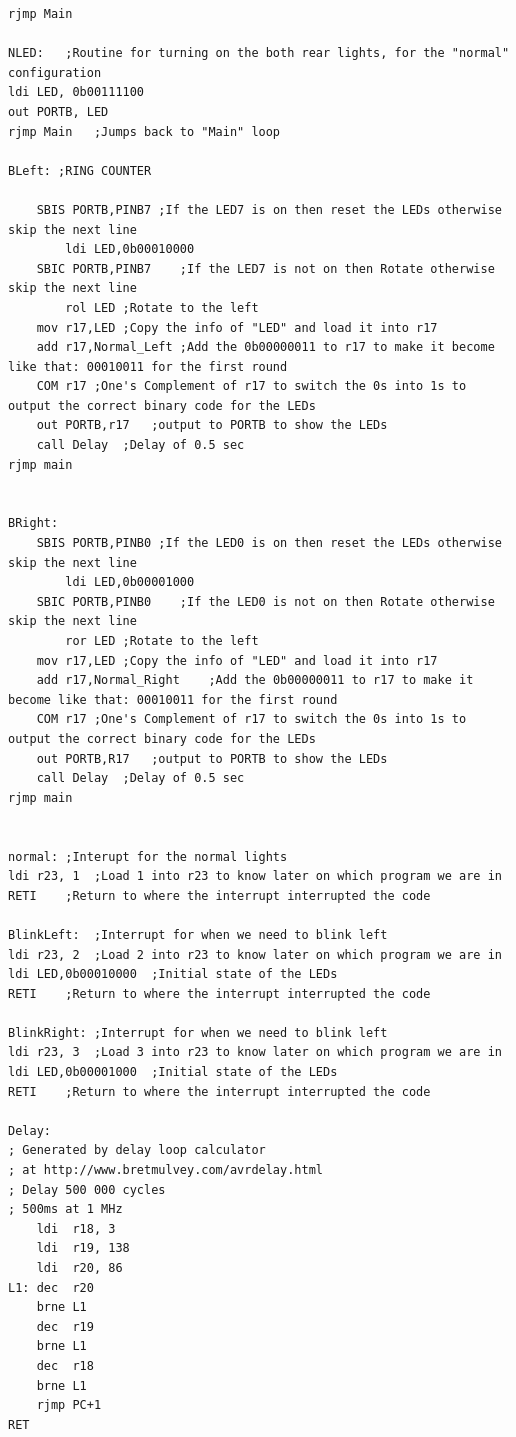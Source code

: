 \documentclass[a4paper,12pt]{article}
\begin{document}
\begin{lstlisting}
rjmp Main

NLED:	;Routine for turning on the both rear lights, for the "normal" configuration
ldi LED, 0b00111100
out PORTB, LED
rjmp Main	;Jumps back to "Main" loop 

BLeft: ;RING COUNTER

	SBIS PORTB,PINB7 ;If the LED7 is on then reset the LEDs otherwise skip the next line
		ldi LED,0b00010000
	SBIC PORTB,PINB7	;If the LED7 is not on then Rotate otherwise skip the next line 
		rol LED	;Rotate to the left 
	mov r17,LED	;Copy the info of "LED" and load it into r17
	add r17,Normal_Left	;Add the 0b00000011 to r17 to make it become like that: 00010011 for the first round 
	COM r17	;One's Complement of r17 to switch the 0s into 1s to output the correct binary code for the LEDs
	out PORTB,r17	;output to PORTB to show the LEDs
	call Delay	;Delay of 0.5 sec
rjmp main


BRight:
	SBIS PORTB,PINB0 ;If the LED0 is on then reset the LEDs otherwise skip the next line
		ldi LED,0b00001000
	SBIC PORTB,PINB0	;If the LED0 is not on then Rotate otherwise skip the next line 
		ror LED	;Rotate to the left 
	mov r17,LED	;Copy the info of "LED" and load it into r17
	add r17,Normal_Right	;Add the 0b00000011 to r17 to make it become like that: 00010011 for the first round 
	COM r17	;One's Complement of r17 to switch the 0s into 1s to output the correct binary code for the LEDs
	out PORTB,R17	;output to PORTB to show the LEDs
	call Delay	;Delay of 0.5 sec
rjmp main


normal:	;Interupt for the normal lights
ldi r23, 1	;Load 1 into r23 to know later on which program we are in
RETI	;Return to where the interrupt interrupted the code 

BlinkLeft:	;Interrupt for when we need to blink left 
ldi r23, 2	;Load 2 into r23 to know later on which program we are in
ldi LED,0b00010000	;Initial state of the LEDs 
RETI	;Return to where the interrupt interrupted the code 

BlinkRight:	;Interrupt for when we need to blink left 
ldi r23, 3	;Load 3 into r23 to know later on which program we are in
ldi LED,0b00001000	;Initial state of the LEDs
RETI	;Return to where the interrupt interrupted the code 

Delay:
; Generated by delay loop calculator
; at http://www.bretmulvey.com/avrdelay.html
; Delay 500 000 cycles
; 500ms at 1 MHz
    ldi  r18, 3
    ldi  r19, 138
    ldi  r20, 86
L1: dec  r20
    brne L1
    dec  r19
    brne L1
    dec  r18
    brne L1
    rjmp PC+1
RET
\end{lstlisting}
\end{document}
